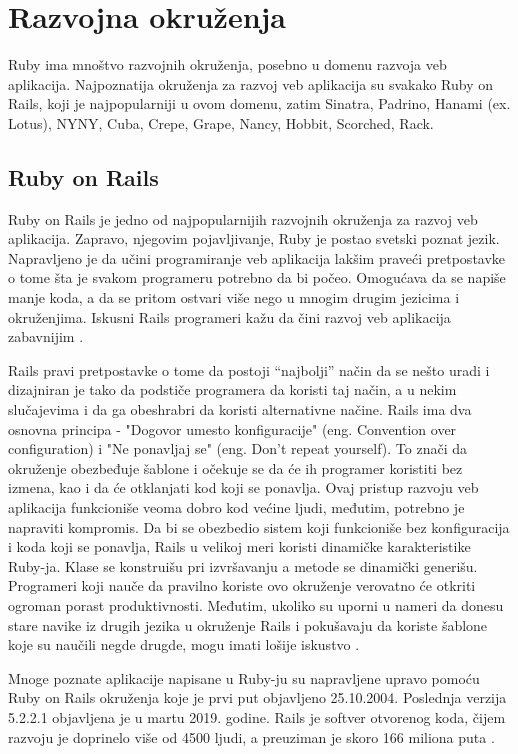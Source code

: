 \documentclass[a4paper]{article}
\begin{document}
\section{Razvojna okruženja}
Ruby ima mnoštvo razvojnih okruženja, posebno u domenu razvoja veb aplikacija. Najpoznatija okruženja za razvoj veb aplikacija su svakako Ruby on Rails, koji je najpopularniji u ovom domenu, zatim Sinatra, Padrino, Hanami (ex. Lotus), NYNY, Cuba, Crepe, Grape, Nancy, Hobbit, Scorched, Rack.
\subsection{Ruby on Rails}
Ruby on Rails je jedno od najpopularnijih razvojnih okruženja za razvoj veb aplikacija. Zapravo, njegovim pojavljivanje, Ruby je postao svetski poznat jezik. Napravljeno je da učini programiranje veb aplikacija lakšim praveći pretpostavke o tome šta je svakom programeru potrebno da bi počeo. Omogućava da se napiše manje koda, a da se pritom ostvari više nego u mnogim drugim jezicima i okruženjima. Iskusni Rails programeri kažu da čini razvoj veb aplikacija zabavnijim \cite{rubyOnRails}.

Rails pravi pretpostavke o tome da postoji “najbolji” način da se nešto uradi i dizajniran je tako da podstiče programera da koristi taj način, a u nekim slučajevima i da ga obeshrabri da koristi alternativne načine.  Rails ima dva osnovna principa - "Dogovor umesto konfiguracije" (eng. Convention over configuration) i "Ne ponavljaj se" (eng. Don't repeat yourself). To znači da okruženje obezbeđuje šablone i očekuje se da će ih programer koristiti bez izmena, kao i da će otklanjati kod koji se ponavlja. Ovaj pristup razvoju veb aplikacija funkcioniše veoma dobro kod većine ljudi, međutim, potrebno je napraviti kompromis. Da bi se obezbedio sistem koji funkcioniše bez konfiguracija i koda koji se ponavlja, Rails u velikoj meri koristi dinamičke karakteristike Ruby-ja. Klase se konstruišu pri izvršavanju a metode se dinamički generišu. Programeri koji nauče da pravilno koriste ovo okruženje verovatno će otkriti ogroman porast produktivnosti. Međutim, ukoliko su uporni u nameri da donesu stare navike iz drugih jezika u okruženje Rails i pokušavaju da koriste šablone koje su naučili negde drugde, mogu imati lošije iskustvo \cite{rubyOnRails}\cite{specDynTech}.


Mnoge poznate aplikacije napisane u Ruby-ju su napravljene upravo pomoću Ruby on Rails okruženja koje je prvi put objavljeno 25.10.2004. Poslednja verzija 5.2.2.1 objavljena je u martu 2019. godine. Rails je softver otvorenog koda, čijem razvoju je doprinelo više od 4500 ljudi, a preuziman je skoro 166 miliona puta \cite{rubyToolbox}.
\end{document}
